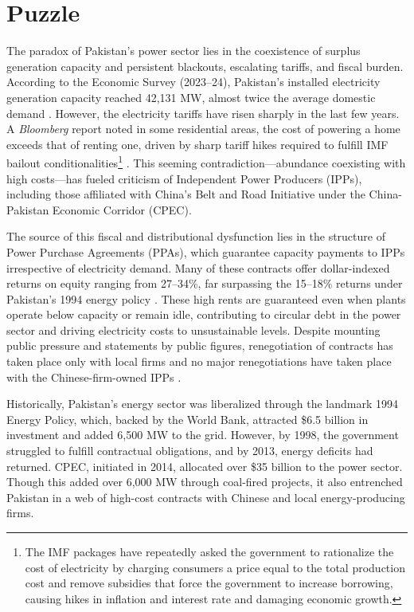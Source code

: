 \documentclass[12pt]{article}
\begin{document}
\section{Puzzle}
The paradox of Pakistan’s power sector lies in the coexistence of surplus generation capacity and persistent blackouts, escalating tariffs, and fiscal burden. According to the Economic Survey (2023--24), Pakistan’s installed electricity generation capacity reached 42{,}131 MW, almost twice the average domestic demand \citep{PakistanSurvey2024}. However, the electricity tariffs have risen sharply in the last few years. A \textit{Bloomberg} report noted in some residential areas, the cost of powering a home exceeds that of renting one, driven by sharp tariff hikes required to fulfill IMF bailout conditionalities\footnote{The IMF packages have repeatedly asked the government to rationalize the cost of electricity by charging consumers a price equal to the total production cost and remove subsidies that force the government to increase borrowing, causing hikes in inflation and interest rate and damaging economic growth.} \citep{Kiani2024}. This seeming contradiction---abundance coexisting with high costs---has fueled criticism of Independent Power Producers (IPPs), including those affiliated with China’s Belt and Road Initiative under the China-Pakistan Economic Corridor (CPEC).

The source of this fiscal and distributional dysfunction lies in the structure of Power Purchase Agreements (PPAs), which guarantee capacity payments to IPPs irrespective of electricity demand. Many of these contracts offer dollar-indexed returns on equity ranging from 27--34\%, far surpassing the 15--18\% returns under Pakistan’s 1994 energy policy \citep{IEEFA2020}. These high rents are guaranteed even when plants operate below capacity or remain idle, contributing to circular debt in the power sector and driving electricity costs to unsustainable levels. Despite mounting public pressure and statements by public figures, renegotiation of contracts has taken place only with local firms and no major renegotiations have taken place with the Chinese-firm-owned IPPs \citep{BusinessRecorder2024b}.

Historically, Pakistan’s energy sector was liberalized through the landmark 1994 Energy Policy, which, backed by the World Bank, attracted \$6.5 billion in investment and added 6{,}500 MW to the grid. However, by 1998, the government struggled to fulfill contractual obligations, and by 2013, energy deficits had returned. CPEC, initiated in 2014, allocated over \$35 billion to the power sector. Though this added over 6{,}000 MW through coal-fired projects, it also entrenched Pakistan in a web of high-cost contracts with Chinese and local energy-producing firms.
\end{document}

